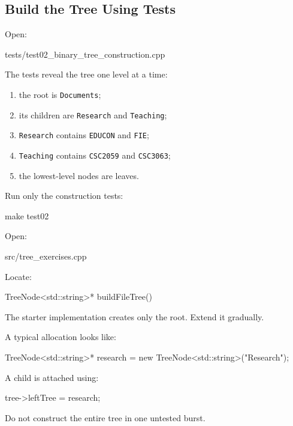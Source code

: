 \documentclass{csc2059practical}
\begin{document}
\subsection{Build the Tree Using Tests}

Open:

\begin{terminal}
tests/test02_binary_tree_construction.cpp
\end{terminal}

The tests reveal the tree one level at a time:

\begin{enumerate}
    \item the root is \texttt{Documents};
    \item its children are \texttt{Research} and \texttt{Teaching};
    \item \texttt{Research} contains \texttt{EDUCON} and \texttt{FIE};
    \item \texttt{Teaching} contains \texttt{CSC2059} and \texttt{CSC3063};
    \item the lowest-level nodes are leaves.
\end{enumerate}

Run only the construction tests:

\begin{terminal}
make test02
\end{terminal}

Open:

\begin{terminal}
src/tree_exercises.cpp
\end{terminal}

Locate:

\begin{cppcode}
TreeNode<std::string>* buildFileTree()
\end{cppcode}

The starter implementation creates only the root. Extend it gradually.

A typical allocation looks like:

\begin{cppcode}
TreeNode<std::string>* research =
    new TreeNode<std::string>("Research");
\end{cppcode}

A child is attached using:

\begin{cppcode}
tree->leftTree = research;
\end{cppcode}

Do not construct the entire tree in one untested burst.
\end{document}
